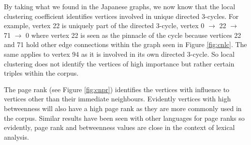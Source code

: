 By taking what we found in the Japanese graphs, we now know that the local clustering coefficient identifies vertices involved in unique directed 3-cycles. For example, vertex 22 is uniquely part of the directed 3-cycle, vertex 0 $\rightarrow$ 22 $\rightarrow$ 71 $\rightarrow$ 0 where vertex 22 is seen as the pinnacle of the cycle because vertices 22 and 71 hold other edge connections within the graph seen in Figure \ref{fig:cnlc}. The same applies to vertex 94 as it is involved in its own directed 3-cycle. So local clustering does not identify the vertices of high importance but rather certain triples within the corpus.

The page rank (see Figure \ref{fig:cnpr}) identifies the vertices with influence to vertices other than their immediate neighbours. Evidently vertices with high betweenness will also have a high page rank as they are more commonly used in the corpus. Similar results have been seen with other languages for page ranks so evidently, page rank and betweenness values are close in the context of lexical analysis.

